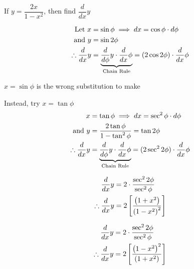 \documentclass[14pt,fleqn]{extarticle}
\newcommand\msq{\left(1-x^2 \right)}
\newcommand\psq{\left(1+x^2 \right)}
\begin{document}
 
\begin{question}
	\statement 
    
    If $y = \dfrac{2x}{1-x^2}$, then find $\dfrac{d}{dx}y$ 
    
    \begin{step}
  \begin{options} 
       
     \incorrect
     
     \begin{align}
	\text{Let } x &= \sin\phi \implies dx = \cos\phi\cdot d \phi \\
	\text{and } y &= \sin 2\phi \\
	\therefore \frac{d}{dx} y &= \underbrace{\frac{d}{d\phi} y \cdot \frac{d}{dx} \phi}_{\text{Chain Rule}} = (2\cos2\phi)\cdot \frac{d}{dx} \phi
\end{align}
    \end{options} 
     \reason 
     
     $x=\sin\phi$ is the wrong substitution to make \newline 
     
     Instead, try $x = \tan\phi$ 
     \begin{align}
     x &= \tan\phi \implies dx = \sec^2\phi\cdot d\phi \\
     \text{and } y &= \frac{2\tan\phi}{1-\tan^2\phi} = \tan 2\phi \\
     \therefore \frac{d}{dx} y &= \underbrace{\frac{d}{d\phi}y\cdot \frac{d}{dx} \phi}_{\text{Chain Rule}} = (2\sec^2 2\phi)\cdot \frac{d}{dx}\phi 
\end{align}
       
\end{step} 

\begin{step}
  \begin{options} 
     \correct 

\begin{align}
	\ddx y &= 2\cdot \dfrac{\sec^2 2\phi}{\sec^2\phi} \\
	\therefore \ddx y &= 2 \left[\dfrac{\psq}{\msq^2} \right]
\end{align}       

     \incorrect

\begin{align}
	\ddx y &= 2\cdot \dfrac{\sec^2 2\phi}{\sec^2\phi} \\
	\therefore \ddx y &= 2 \left[\dfrac{\msq^2}{\psq} \right]
\end{align}
        
    \end{options} 
     \reason 
       

\end{step}
\end{question}
\end{document}
